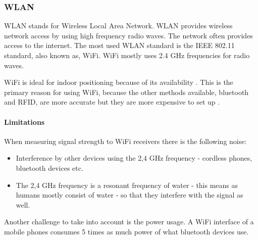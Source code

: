 \subsubsection{WLAN}\label{wifi}
WLAN stands for Wireless Local Area Network.
WLAN provides wireless network access by using high frequency radio waves.
The network often provides access to the internet.
The most used WLAN standard is the IEEE 802.11 standard\cite{ieee_wifi_standard}, also known as, WiFi.
WiFi mostly uses 2.4 GHz frequencies for radio waves\cite{ieee_wifi_standard}.


WiFi is ideal for indoor positioning because of its availability
\cite{indoor_maps_google_slides}\cite{improving_wifi_using_bluetooth}.
This is the primary reason for using WiFi, because the other methods available, bluetooth and RFID, are more accurate but they are more expensive to set up \cite{improving_wifi_using_bluetooth}.

\paragraph{Limitations}
When measuring signal strength to WiFi receivers there is the following noise:
 \begin{itemize}
 	\item Interference by other devices using the 2,4 GHz frequency - cordless phones, bluetooth devices etc.
 	\item The 2,4 GHz frequency is a resonant frequency of water - this means as humans mostly consist of water - so that they interfere with the signal as well.
\end{itemize}
 
Another challenge to take into account is the power usage.
A WiFi interface  of a mobile phones consumes 5 times as much power of what bluetooth devices use\cite{bluetooth_basics}.